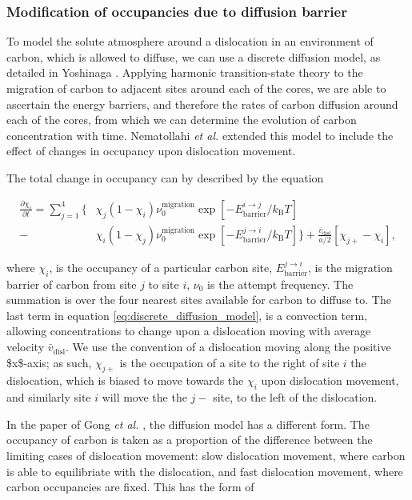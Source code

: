 \documentclass[a4paper,11pt]{article}
\begin{document}
\subsubsection{Modification of occupancies due to diffusion barrier}
\label{sec:orgc59d506}


To model the solute atmosphere around a dislocation in an environment of
carbon, which is allowed to diffuse, we can use a discrete diffusion model,
as detailed in Yoshinaga \cite{Yoshinaga1971}. Applying harmonic
transition-state theory to the migration of carbon to adjacent sites around each of the cores,
we are able to ascertain the energy barriers, and therefore the rates of
carbon diffusion around each of the cores, from which we can determine the
evolution of carbon concentration with time. Nematollahi \emph{et al.} \cite{Nematollahi2016} extended this model
to include the effect of changes in occupancy upon dislocation movement.

The total change in occupancy can by described by
the equation

\begin{align*}
  \frac{\partial \chi_i}{\partial t} = \sum_{j=1}^4
 \Big\{ &\chi_j (1 - \chi_i) \nu_0^{\text{migration}} \exp{\left[ -
E_{\text{barrier}}^{i\rightarrow j} / k_{\text{B}} T\right]}\\ -
       &\chi_i (1 - \chi_j) \nu_0^{\text{migration}} \exp{\left[ -
E_{\text{barrier}}^{j\rightarrow i} / k_{\text{B}} T\right]}
\Big\} + \frac{\bar{v}_{\text{disl}}}{a/2} [\chi_{j+} - \chi_{i}],\label{eq:discrete_diffusion_model}
\end{align*}

where \(\chi_i\), is the occupancy of a particular carbon site,
\(E_{\text{barrier}}^{j\rightarrow i}\), is the migration barrier of carbon
from site \(j\) to site \(i\), \(\nu_0\) is the attempt frequency. The summation
is over the four nearest sites available for carbon to diffuse to. The last term
in equation \eqref{eq:discrete_diffusion_model}, is a convection term,
allowing concentrations to change upon a dislocation moving with average velocity
\(\bar{v}_{\text{disl}}\). We use the convention of a dislocation moving along
the positive \$x\$-axis; as such, \(\chi_{j+}\)
is the occupation of a site to the right of site \(i\) the dislocation, which is biased
to move towards the \(\chi_i\) upon dislocation movement, and similarly site
\(i\) will move the the \(j-\) site, to the left of the dislocation.


In the paper of Gong \emph{et al.} \cite{Gong2020}, the diffusion model has a
different form. The occupancy of carbon is
taken as a proportion of the difference between the limiting cases of
dislocation movement: slow dislocation movement, where carbon is able to
equilibriate with the dislocation, and fast dislocation movement, where
carbon occupancies are fixed. This has the form of
\end{document}
